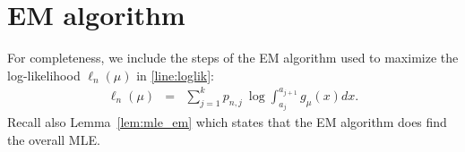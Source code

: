 \documentclass[12pt]{article} %
\begin{document}





\appendix

\section{EM algorithm}\label{appendix:EM}


For completeness, we include the steps of the EM algorithm used to maximize the log-likelihood $\ell_n(\mu)$ in \eqref{line:loglik}:
\begin{eqnarray*}
\ell_n(\mu) &=& \sum_{j=1}^k p_{n,j} \ \log \int_{a_j}^{a_{j+1}}  g_{\mu}(x)dx. 
\end{eqnarray*}
Recall also Lemma~\ref{lem:mle_em} which states that the EM algorithm does find the overall MLE.  
\end{document}
